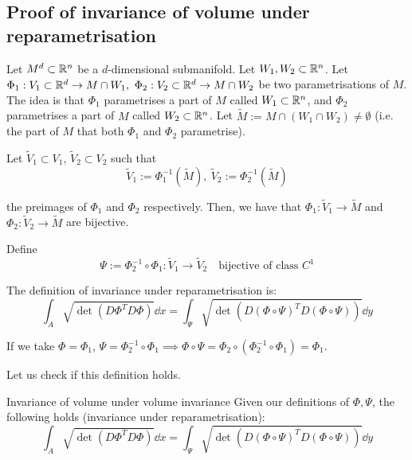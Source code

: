 \documentclass[12pt]{article}
\begin{document}
\subsection{Proof of invariance of volume under reparametrisation}

Let $M^d \subset \mathbb{R}^n$ be a $d$-dimensional submanifold. Let $W_1, W_2 \subset \mathbb{R}^n$. Let $\Phi_1: V_1 \subset \mathbb{R}^d \rightarrow M \cap W_1,\ \Phi_2: V_2 \subset \mathbb{R}^d \rightarrow M \cap W_2$ be two parametrisations of $M$. The idea is that $\Phi_1$ parametrises a part of $M$ called $W_1 \subset \mathbb{R}^n$, and $\Phi_2$ parametrises a part of $M$ called $W_2 \subset \mathbb{R}^n$. Let $\tilde{M} := M \cap (W_1 \cap W_2) \neq \emptyset$ (i.e. the part of $M$ that both $\Phi_1$ and $\Phi_2$ parametrise).

Let $\tilde{V}_1 \subset V_1$, $\tilde{V}_2 \subset V_2$ such that
$$
    \tilde{V}_1 := \Phi_1^{-1}(\tilde{M}),\ \tilde{V}_2 := \Phi_2^{-1}(\tilde{M})
$$

the preimages of $\Phi_1$ and $\Phi_2$ respectively. Then, we have that $\Phi_1: \tilde{V}_1 \rightarrow \tilde{M}$ and $\Phi_2: \tilde{V}_2 \rightarrow \tilde{M}$ are bijective.

Define 
$$
    \Psi := \Phi_2^{-1} \circ \Phi_1: \tilde{V}_1 \rightarrow \tilde{V}_2 \quad\text{bijective of class } C^1
$$

The definition of invariance under reparametrisation is:
$$
    \boxed{\int_A \sqrt{\det\left( D\Phi^T D \Phi \right)} \dd x= \int_{\Psi} \sqrt{\det\left( D\left( \Phi \circ \Psi \right)^T D\left( \Phi \circ \Psi \right) \right)} \dd y}
$$

If we take $\Phi = \Phi_1$, $\Psi = \Phi_2^{-1} \circ \Phi_1 \implies \Phi \circ \Psi = \Phi_2 \circ \left( \Phi_2^{-1} \circ \Phi_1 \right) = \Phi_1$.

Let us check if this definition holds.

\begin{lemma}{Invariance of volume under volume invariance}{}
    Given our definitions of $\Phi, \Psi$, the following holds (invariance under reparametrisation):
    $$
        \int_A \sqrt{\det\left( D\Phi^T D \Phi \right)} \dd x = \int_{\Psi} \sqrt{\det\left( D\left( \Phi \circ \Psi \right)^T D\left( \Phi \circ \Psi \right) \right)} \dd y
    $$
\end{lemma}
\end{document}
